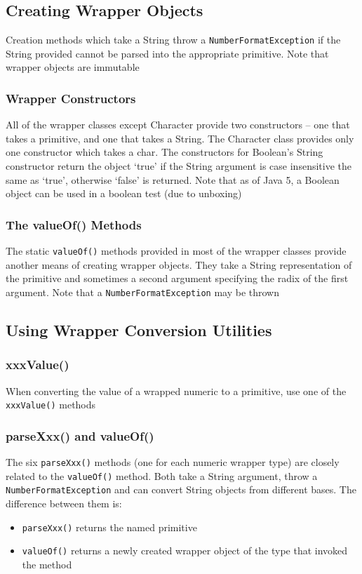 \subsection{Creating Wrapper Objects}
Creation methods which take a String throw a \verb#NumberFormatException# if 
the String provided cannot be parsed into the appropriate primitive. Note that 
wrapper objects are immutable

\subsubsection{Wrapper Constructors}
All of the wrapper classes except Character provide two constructors -- one 
that takes a primitive, and one that takes a String. The Character class 
provides only one constructor which takes a char. The constructors for 
Boolean's String constructor return the object `true' if the String argument is 
case insensitive the same as `true', otherwise `false' is returned. Note that 
as of Java 5, a Boolean object can be used in a boolean test (due to unboxing)

\subsubsection{The valueOf() Methods}
The static \verb#valueOf()# methods provided in most of the wrapper classes 
provide another means of creating wrapper objects. They take a String 
representation of the primitive and sometimes a second argument specifying the 
radix of the first argument. Note that a \verb#NumberFormatException# may be 
thrown

\subsection{Using Wrapper Conversion Utilities}
\subsubsection{xxxValue()}
When converting the value of a wrapped numeric to a primitive, use one of the
\verb#xxxValue()# methods

\subsubsection{parseXxx() and valueOf()}
The six \verb#parseXxx()# methods (one for each numeric wrapper type) are 
closely related to the \verb#valueOf()# method. Both take a String argument, 
throw a \verb#NumberFormatException# and can convert String objects from 
different bases. The difference between them is:
\begin{itemize}
    \item \verb#parseXxx()# returns the named primitive
    \item \verb#valueOf()# returns a newly created wrapper object of the type 
    that invoked the method
\end{itemize}

